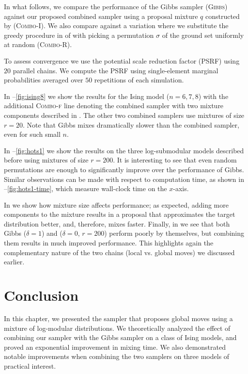 In what follows, we compare the performance of the Gibbs sampler (\textsc{Gibbs}) against our proposed combined sampler using a proposal mixture $q$ constructed by  (\textsc{Combo-I}).
We also compare against a variation where we substitute the greedy procedure in  of  with picking a permutation $\sigma$ of the ground set uniformly at random (\textsc{Combo-R}).

To assess convergence we use the potential scale reduction factor (PSRF) \citep{brooks11} using $20$ parallel chains.
We compute the PSRF using single-element marginal probabilities averaged over $50$ repetitions of each simulation.

In --\ref{fig:ising8} we show the results for the Ising model ($n = 6, 7, 8$) with the additional \textsc{Combo-f} line denoting the combined sampler with two mixture components described in .
The other two combined samplers use mixtures of size $r = 20$.
Note that Gibbs mixes dramatically slower than the combined sampler, even for such small $n$.

In --\ref{fig:hots1} we show the results on the three log-submodular models described before using mixtures of size $r = 200$.
It is interesting to see that even random permutations are enough to significantly improve over the performance of Gibbs.
Similar observations can be made with respect to computation time, as shown in --\ref{fig:hots1-time}, which measure wall-clock time on the $x$-axis.

In  we show how mixture size affects performance; as expected, adding more components to the mixture results in a proposal that approximates the target distribution better, and, therefore, mixes faster.
Finally, in  we see that both Gibbs ($\delta = 1$) and \Ms{} ($\delta = 0$, $r = 200$) perform poorly by themselves, but combining them results in much improved performance.
This highlights again the complementary nature of the two chains (local vs. global moves) we discussed earlier.

\section{Conclusion}
In this chapter, we presented the \Ms{} sampler that proposes global moves using a mixture of log-modular distributions.
We theoretically analyzed the effect of combining our sampler with the Gibbs sampler on a class of Ising models, and proved an exponential improvement in mixing time.
We also demonstrated notable improvements when combining the two samplers on three models of practical interest.

